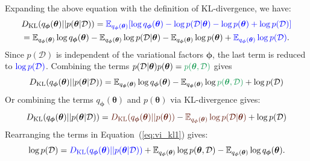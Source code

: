Expanding the above equation with the definition of \ac{KL}-divergence, we have:
\begin{multline}
    D_{\text{KL}}(q_{\boldsymbol{\phi}}(\boldsymbol{\theta}) || p(\boldsymbol{\theta}|\mathcal{D})) = \textcolor{blue}{\mathbb{E}_{q_{\boldsymbol{\phi}}(\boldsymbol{\theta})}[\log q_{\boldsymbol{\phi}}(\boldsymbol{\theta}) - \log p(\mathcal{D}|\boldsymbol{\theta}) - \log p(\boldsymbol{\theta}) + \log p(\mathcal{D})]}\\
    = \mathbb{E}_{q_{\boldsymbol{\phi}}(\boldsymbol{\theta})}\log q_{\boldsymbol{\phi}}(\boldsymbol{\theta})-\mathbb{E}_{q_{\boldsymbol{\phi}}(\boldsymbol{\theta})}\log p(\mathcal{D}|\boldsymbol{\theta})-\mathbb{E}_{q_{\boldsymbol{\phi}}(\boldsymbol{\theta})}\log p(\boldsymbol{\theta}) + \textcolor{blue}{\mathbb{E}_{q_{\boldsymbol{\phi}}(\boldsymbol{\theta})}\log p(\mathcal{D})}.
\end{multline}
Since $p(\mathcal{D})$ is independent of the variational factors $\boldsymbol{\phi}$, the last term is reduced to $\textcolor{blue}{\log p(\mathcal{D})}$.
Combining the terms $p(\mathcal{D}|\boldsymbol{\theta})p(\boldsymbol{\theta})=\textcolor{ForestGreen}{p(\boldsymbol{\theta}, \mathcal{D})}$ gives
\begin{equation}
    \label{eq:vi_kl1}
    D_{\text{KL}}(q_{\boldsymbol{\phi}}(\boldsymbol{\theta}) || p(\boldsymbol{\theta}|\mathcal{D})) = \mathbb{E}_{q_{\boldsymbol{\phi}}(\boldsymbol{\theta})}\log q_{\boldsymbol{\phi}}(\boldsymbol{\theta})-\mathbb{E}_{q_{\boldsymbol{\phi}}(\boldsymbol{\theta})}\log \textcolor{ForestGreen}{p(\boldsymbol{\theta}, \mathcal{D})} + \log p(\mathcal{D})
\end{equation}
Or combining the terms $q_{\boldsymbol{\phi}}(\boldsymbol{\theta})$ and $p(\boldsymbol{\theta})$ via \ac{KL}-divergence gives:
\begin{equation}
    \label{eq:vi_kl2}
    D_{\text{KL}}(q_{\boldsymbol{\phi}}(\boldsymbol{\theta}) || p(\boldsymbol{\theta}|\mathcal{D}))=\textcolor{Sepia}{D_{\text{KL}}(q_{\boldsymbol{\phi}}(\boldsymbol{\theta})||p(\boldsymbol{\theta}))} - \textcolor{Sepia}{\mathbb{E}_{q_{\boldsymbol{\phi}}(\boldsymbol{\theta})}\log p(\mathcal{D}|\boldsymbol{\theta})} + \log p(\mathcal{D})
\end{equation}
Rearranging the terms in Equation~(\ref{eq:vi_kl1}) gives:
\begin{equation}
    \log p(\mathcal{D}) = \textcolor{blue}{D_{\text{KL}}(q_{\boldsymbol{\phi}}(\boldsymbol{\theta}) || p(\boldsymbol{\theta}|\mathcal{D}))}+\mathbb{E}_{q_{\boldsymbol{\phi}}(\boldsymbol{\theta})}\log p(\boldsymbol{\theta}, \mathcal{D})-\mathbb{E}_{q_{\boldsymbol{\phi}}(\boldsymbol{\theta})}\log q_{\boldsymbol{\phi}}(\boldsymbol{\theta}).
\end{equation} 
